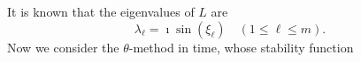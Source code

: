 \documentclass[smallextended,numbook,runningheads]{svjour3}     %
\newtheorem{lemma}{Lemma}
\newtheorem{lemma}{Lemma}
\begin{document}
It is known that the eigenvalues of $L$ are 
\begin{equation}\label{Leigenvalues}
\lambda_\ell=\imath \sin(\xi_\ell)\quad (1\le\ell\le m).
\end{equation}
%
%
Now we consider the $\theta$-method \cite[Chapter IV.3]{hairerwanner} in time, whose stability function %
\end{document}
